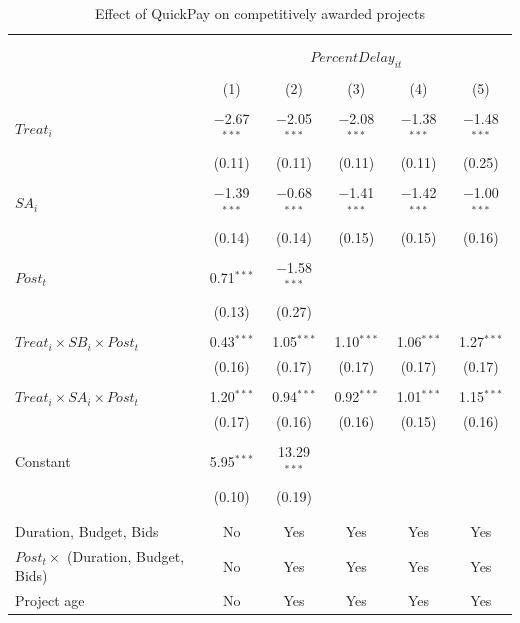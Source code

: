 \documentclass[
]{article}
\begin{document}
\begin{table}[H] \centering 
  \caption{Effect of QuickPay on competitively awarded projects} 
  \label{} 
\small 
\begin{tabular}{@{\extracolsep{-2pt}}lccccc} 
\\[-1.8ex]\hline 
\hline \\[-1.8ex] 
\\[-1.8ex] & \multicolumn{5}{c}{$PercentDelay_{it}$  } \\ 
\\[-1.8ex] & (1) & (2) & (3) & (4) & (5)\\ 
\hline \\[-1.8ex] 
 $Treat_i$ & $-$2.67$^{***}$ & $-$2.05$^{***}$ & $-$2.08$^{***}$ & $-$1.38$^{***}$ & $-$1.48$^{***}$ \\ 
  & (0.11) & (0.11) & (0.11) & (0.11) & (0.25) \\ 
  & & & & & \\ 
 $SA_i$ & $-$1.39$^{***}$ & $-$0.68$^{***}$ & $-$1.41$^{***}$ & $-$1.42$^{***}$ & $-$1.00$^{***}$ \\ 
  & (0.14) & (0.14) & (0.15) & (0.15) & (0.16) \\ 
  & & & & & \\ 
 $Post_t$ & 0.71$^{***}$ & $-$1.58$^{***}$ &  &  &  \\ 
  & (0.13) & (0.27) &  &  &  \\ 
  & & & & & \\ 
 $Treat_i \times SB_i \times Post_t$ & 0.43$^{***}$ & 1.05$^{***}$ & 1.10$^{***}$ & 1.06$^{***}$ & 1.27$^{***}$ \\ 
  & (0.16) & (0.17) & (0.17) & (0.17) & (0.17) \\ 
  & & & & & \\ 
 $Treat_i \times SA_i \times Post_t$ & 1.20$^{***}$ & 0.94$^{***}$ & 0.92$^{***}$ & 1.01$^{***}$ & 1.15$^{***}$ \\ 
  & (0.17) & (0.16) & (0.16) & (0.15) & (0.16) \\ 
  & & & & & \\ 
 Constant & 5.95$^{***}$ & 13.29$^{***}$ &  &  &  \\ 
  & (0.10) & (0.19) &  &  &  \\ 
  & & & & & \\ 
\hline \\[-1.8ex] 
Duration, Budget, Bids & No & Yes & Yes & Yes & Yes \\ 
$Post_t \times $  (Duration, Budget, Bids) & No & Yes & Yes & Yes & Yes \\ 
Project age & No & Yes & Yes & Yes & Yes \\ 

\end{tabular}
\end{table}
\end{document}
